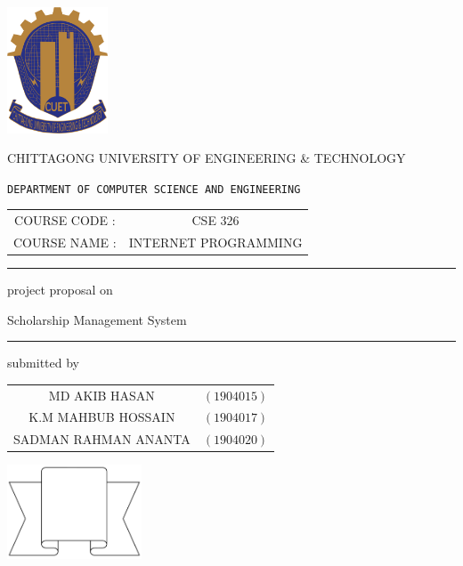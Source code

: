 \documentclass[a4paper,12pt]{report}
\begin{document}
\begin{titlepage}
	\scshape
	\centering

	\includegraphics[width=3cm, keepaspectratio]{cuet.png} \par \vspace{0.1cm}
	\begin{Large}
		CHITTAGONG UNIVERSITY OF ENGINEERING \& TECHNOLOGY
	\end{Large}
	\par
	\texttt{DEPARTMENT OF COMPUTER SCIENCE AND ENGINEERING}
\vspace{3cm}

	\begin{tabular}{cc}
		COURSE CODE : & CSE 326              \\
		COURSE NAME : & INTERNET PROGRAMMING
	\end{tabular}
	\vspace{1cm}

	\raisebox{-\baselineskip}{\rule{\textwidth}{1px}}
	\rule{\textwidth}{1px}

	\vspace{0.2cm}
	{\Large{{project proposal on}}}\par \vspace{0.5cm}
	\huge{{Scholarship Management System }}
	\rule{\textwidth}{2px}

\vspace{1cm}
	\normalsize

	\parbox[l]{9cm}{
		\begin{center}
			submitted by
		\end{center}

		\begin{tabular}{cl}
			MD AKIB HASAN        & $(1904015)$ \\
			K.M MAHBUB HOSSAIN   & $(1904017)$ \\
			SADMAN RAHMAN ANANTA & $(1904020)$ \\
		\end{tabular}
	}
	\parbox[r]{7cm}{
		\vspace{1cm}
		\begin{center}
\includegraphics[width=4cm, keepaspectratio]{remarks.png}
		\end{center}
	}


\end{titlepage}
\end{document}
